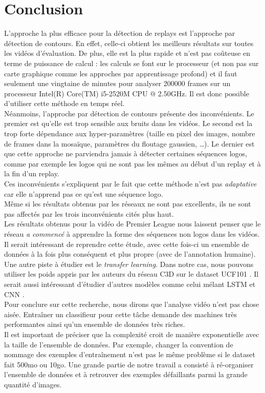 \documentclass[11pt]{article}
\begin{document}
\section{Conclusion}
\label{sec:org8156e54}
L'approche la plus efficace pour la détection de replays est l'approche par détection de contours. En effet, celle-ci obtient les meilleurs résultats sur toutes les vidéos d'évaluation. De plus, elle est la plus rapide et n'est pas coûteuse en terme de puissance de calcul : les calculs se font sur le processeur (et non pas sur carte graphique comme les approches par apprentissage profond) et il faut seulement une vingtaine de minutes pour analyser 200000 frames sur un processeur Intel(R) Core(TM) i5-2520M CPU @ 2.50GHz. Il est donc possible d'utiliser cette méthode en temps réel.\\
Néanmoins, l'approche par détection de contours présente des inconvénients. Le premier est qu'elle est trop sensible aux bruits dans les vidéos. Le second est la trop forte dépendance aux hyper-paramètres (taille en pixel des images, nombre de frames dans la mosaïque, paramètres du floutage gaussien, \ldots{}). Le dernier est que cette approche ne parviendra jamais à détecter certaines séquences logos, comme par exemple les logos qui ne sont pas les mêmes au début d'un replay et à la fin d'un replay.\\
Ces inconvénients s'expliquent par le fait que cette méthode n'est pas \emph{adaptative} car elle n'apprend pas ce qu'est une séquence logo.\\
Même si les résultats obtenus par les réseaux ne sont pas excellents, ils ne sont pas affectés par les trois inconvénients cités plus haut.\\
Les résultats obtenus pour la vidéo de Premier League nous laissent penser que le réseau \emph{a commencé} à apprendre la forme des séquences non logos dans les vidéos.\\
Il serait intéressant de reprendre cette étude, avec cette fois-ci un ensemble de données à la fois plus conséquent et plus propre (avec de l'annotation humaine).\\
Une autre piste à étudier est le \emph{transfer learning}. Dans notre cas, nous pouvons utiliser les poids appris par les auteurs du réseau C3D sur le dataset UCF101 \cite{Tran_2015}. Il serait aussi intéressant d'étudier d'autres modèles comme celui mélant LSTM et CNN \cite{Joe_Yue_Hei_Ng_2015}.\\
Pour conclure sur cette recherche, nous dirons que l'analyse vidéo n'est pas chose aisée. Entraîner un classifieur pour cette tâche demande des machines très performantes ainsi qu'un ensemble de données très riches.\\
Il est important de préciser que la complexité croit de manière exponentielle avec la taille de l'ensemble de données. Par exemple, changer la convention de nommage des exemples d'entraînement n'est pas le même problème si le dataset fait 500mo ou 10go. Une grande partie de notre travail a consisté à ré-organiser l'ensemble de données et à retrouver des exemples défaillants parmi la grande quantité d'images.\\
\end{document}
